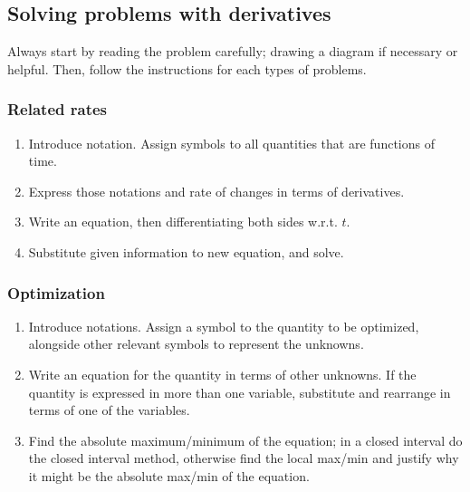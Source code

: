 \documentclass[main.tex]{subfiles}
\begin{document}
\begin{multicols}{2}
	\subsection*{Solving problems with derivatives}
	Always start by reading the problem carefully; drawing a diagram if necessary or helpful. Then, follow the instructions for each types of problems.
	\subsubsection*{Related rates}
	\begin{enumerate}
		\item Introduce notation. Assign symbols to all quantities that are functions of time.
		\item Express those notations and rate of changes in terms of derivatives.
		\item Write an equation, then differentiating both sides w.r.t. \(t\).
		\item Substitute given information to new equation, and solve.
	\end{enumerate}

	\subsubsection*{Optimization}
	\begin{enumerate}
		\item Introduce notations. Assign a symbol to the quantity to be optimized, alongside other relevant symbols to represent the unknowns.
		\item Write an equation for the quantity in terms of other unknowns. If the quantity is expressed in more than one variable, substitute and rearrange in terms of one of the variables.
		\item Find the absolute maximum/minimum of the equation; in a closed interval do the closed interval method, otherwise find the local max/min and justify why it might be the absolute max/min of the equation.
	\end{enumerate}


\end{multicols}
\end{document}
